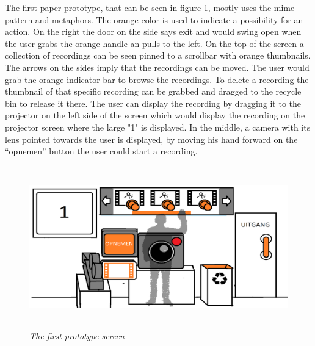 The first paper prototype, that can be seen in figure \ref{first prototype}, mostly uses the mime pattern and metaphors. The orange color is used to indicate a possibility for an action. On the right the door on the side says exit and would swing open when the user grabs the orange handle an pulls to the left. On the top of the screen a collection of recordings can be seen pinned to a scrollbar with orange thumbnails. The arrows on the sides imply that the recordings can be moved. The user would grab the orange indicator bar to browse the recordings. To delete a recording the thumbnail of that specific recording can be grabbed and dragged to the recycle bin to release it there. The user can display the recording by dragging it to the projector on the left side of the screen which would display the recording on the projector screen where the large "1" is displayed. In the middle, a camera with its lens pointed towards the user is displayed, by moving his hand forward on the ``opnemen'' button the user could start a recording.\\

\begin{figure}[H]
	\begin{center}
		\includegraphics[width=12.5cm, height=7cm]{figures/prototype_1_1_standard.png}
		\caption{\emph{The first prototype screen}}
		\label{first prototype}
	\end{center}
\end{figure}

